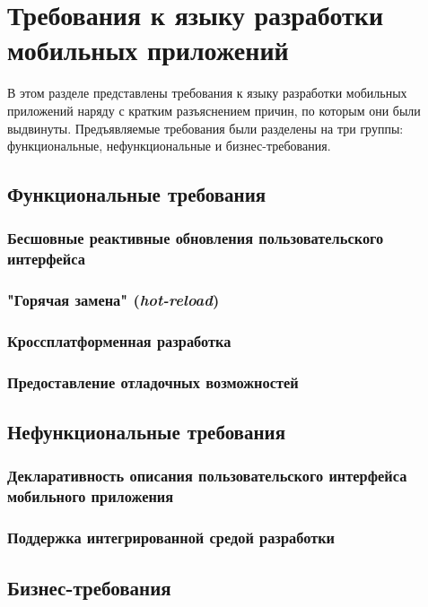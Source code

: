 \section{Требования к языку разработки мобильных приложений}
\label{requirements-section}
В этом разделе представлены требования к языку разработки мобильных приложений
наряду с кратким разъяснением причин, по которым они были выдвинуты.
Предъявляемые требования были разделены на три группы: функциональные,
нефункциональные и бизнес-требования.


\subsection{Функциональные требования}
\subsubsection*{Бесшовные реактивные обновления пользовательского интерфейса}

\subsubsection*{"Горячая замена" (\textit{hot-reload})}

\subsubsection*{Кроссплатформенная разработка}

\subsubsection*{Предоставление отладочных возможностей}


\subsection{Нефункциональные требования}
\subsubsection*{Декларативность описания пользовательского интерфейса мобильного приложения}

\subsubsection*{Поддержка интегрированной средой разработки}


\subsection{Бизнес-требования}
